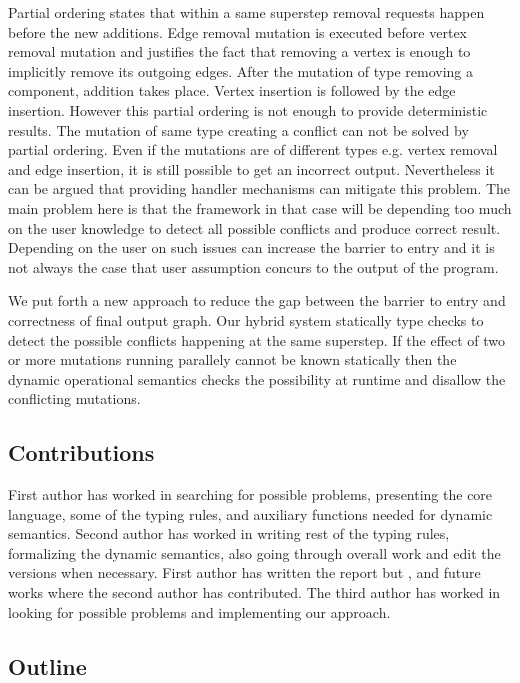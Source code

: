 Partial ordering states that within a same superstep removal requests happen before the new additions. Edge removal mutation is executed before vertex removal mutation and justifies the fact that removing a vertex is enough to implicitly remove its outgoing edges. After the mutation of type removing a component, addition takes place. Vertex insertion is followed by the edge insertion. However this partial ordering is not enough to provide deterministic results. The mutation of same type creating a conflict can not be solved by partial ordering. Even if the mutations are of different types e.g. vertex removal and edge insertion, it is still possible to get an incorrect output. Nevertheless it can be argued that providing handler mechanisms can mitigate this problem. The main problem here is that the framework in that case will be depending too much on the user knowledge to detect all possible conflicts and produce correct result. Depending on the user on such issues can increase the barrier to entry and it is not always the case that user assumption concurs to the output of the program.


We put forth a new approach to reduce the gap between the barrier to entry and correctness of final output graph. Our hybrid system statically type checks to detect the possible conflicts happening at the same superstep. If the effect of two or more mutations running parallely cannot be known statically then the dynamic operational semantics checks the possibility at runtime and disallow the conflicting mutations. 



\subsection{Contributions}
\label{subsec:contrib}

First author has worked in searching for possible problems, presenting the core language, some of the typing rules, and auxiliary functions needed for dynamic semantics. Second author has worked in writing rest of the typing rules, formalizing the dynamic semantics, also going through overall work and edit the versions when necessary. First author has written the report but ,  and future works where the second author has contributed. The third author has worked in looking for possible problems and implementing our approach.


\subsection{Outline}
\label{subsec:outline}

